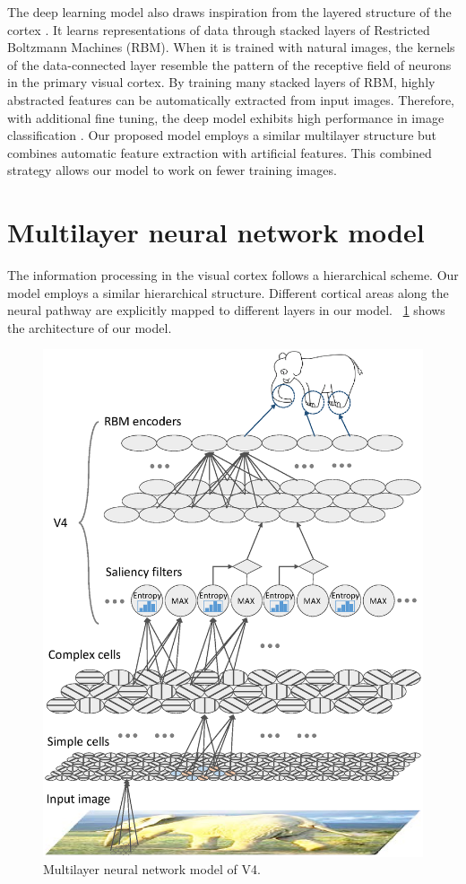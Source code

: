 \documentclass[twocolumn]{article}
\begin{document}
The deep learning model also draws inspiration from the layered structure of the cortex \cite{bengio2009}.
It learns representations of data through stacked layers of Restricted Boltzmann Machines (RBM).
When it is trained with natural images, 
the kernels of the data-connected layer resemble the pattern of the receptive field of neurons in the primary visual cortex.
By training many stacked layers of RBM, highly abstracted features can be automatically extracted from input images.
Therefore, with additional fine tuning, the deep model exhibits high performance in image classification \cite{krizhevsky2012}.
Our proposed model employs a similar multilayer structure but combines automatic feature extraction with artificial features.
This combined strategy allows our model to work on fewer training images.

\section{Multilayer neural network model}\label{sec:3}

The information processing in the visual cortex follows a hierarchical scheme.
Our model employs a similar hierarchical structure.
Different cortical areas along the neural pathway are explicitly mapped to different layers in our model. 
\figurename~\ref{fig:3} shows the architecture of our model.

\begin{figure}[!t]
\centerline{\includegraphics[width=\linewidth]{images/fig3.eps}} 
\caption{Multilayer neural network model of V4.}
\label{fig:3}
\end{figure}
\end{document}
